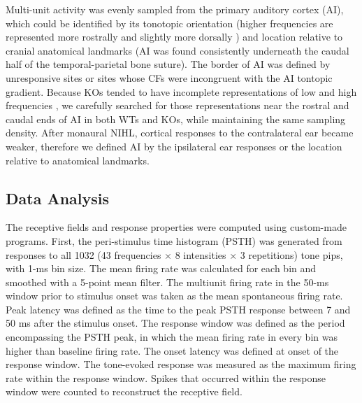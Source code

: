 Multi-unit activity was evenly sampled from the primary auditory cortex (AI), which could be identified by its tonotopic orientation (higher frequencies are represented more rostrally and slightly more dorsally \cite{Guo2012}) and location relative to cranial anatomical landmarks (AI was found consistently underneath the caudal half of the temporal-parietal bone suture). The border of AI was defined by unresponsive sites or sites whose CFs were incongruent with the AI tontopic gradient. Because KOs tended to have incomplete representations of low and high frequencies \cite{Yang2013}, we carefully searched for those representations near the rostral and caudal ends of AI in both WTs and KOs, while maintaining the same sampling density. After monaural NIHL, cortical responses to the contralateral ear became weaker, therefore we defined AI by the ipsilateral ear responses or the location relative to anatomical landmarks.

\subsection{Data Analysis}

The receptive fields and response properties were computed using custom-made programs. First, the peri-stimulus time histogram (PSTH) was generated from responses to all 1032 (43 frequencies $\times$ 8 intensities $\times$ 3 repetitions) tone pips, with 1-ms bin size. The mean firing rate was calculated for each bin and smoothed with a 5-point mean filter. The multiunit firing rate in the 50-ms window prior to stimulus onset was taken as the mean spontaneous firing rate. Peak latency was defined as the time to the peak PSTH response between 7 and 50 ms after the stimulus onset. The response window was defined as the period encompassing the PSTH peak, in which the mean firing rate in every bin was higher than baseline firing rate. The onset latency was defined at onset of the response window. The tone-evoked response was measured as the maximum firing rate within the response window. Spikes that occurred within the response window were counted to reconstruct the receptive field.

